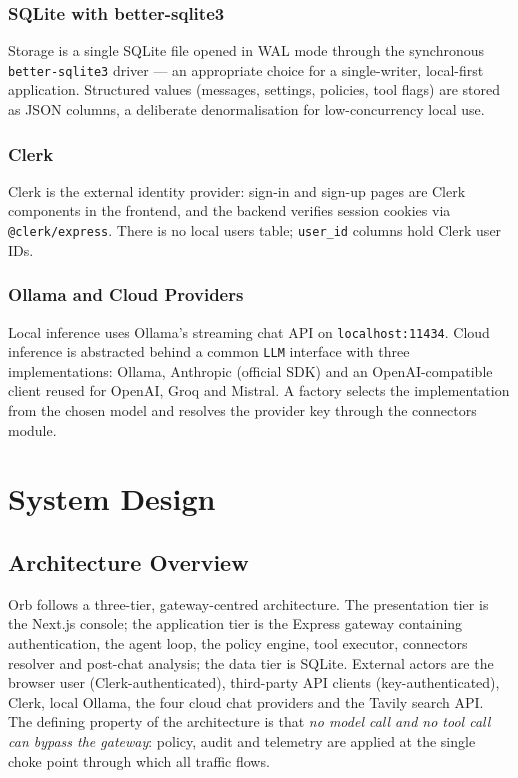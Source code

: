 \documentclass[12pt,a4paper,oneside]{report}
\begin{document}
\subsection{SQLite with better-sqlite3}
Storage is a single SQLite file opened in WAL mode through the
synchronous \texttt{better-sqlite3} driver --- an appropriate choice
for a single-writer, local-first application. Structured values
(messages, settings, policies, tool flags) are stored as JSON columns,
a deliberate denormalisation for low-concurrency local use.

\subsection{Clerk}
Clerk is the external identity provider: sign-in and sign-up pages are
Clerk components in the frontend, and the backend verifies session
cookies via \texttt{@clerk/express}. There is no local users table;
\texttt{user\_id} columns hold Clerk user IDs.

\subsection{Ollama and Cloud Providers}
Local inference uses Ollama's streaming chat API on
\texttt{localhost:11434}. Cloud inference is abstracted behind a
common \texttt{LLM} interface with three implementations: Ollama,
Anthropic (official SDK) and an OpenAI-compatible client reused for
OpenAI, Groq and Mistral. A factory selects the implementation from
the chosen model and resolves the provider key through the connectors
module.

\chapter{System Design}

\section{Architecture Overview}
Orb follows a three-tier, gateway-centred architecture. The
presentation tier is the Next.js console; the application tier is the
Express gateway containing authentication, the agent loop, the policy
engine, tool executor, connectors resolver and post-chat analysis; the
data tier is SQLite. External actors are the browser user
(Clerk-authenticated), third-party API clients (key-authenticated),
Clerk, local Ollama, the four cloud chat providers and the Tavily
search API. The defining property of the architecture is that
\emph{no model call and no tool call can bypass the gateway}: policy,
audit and telemetry are applied at the single choke point through
which all traffic flows.
\end{document}
